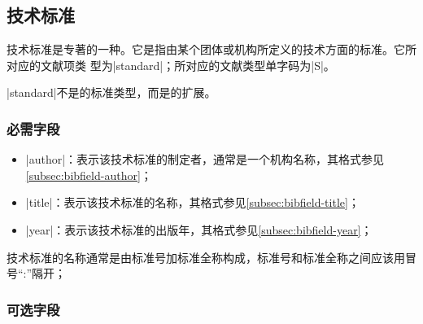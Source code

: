 
\subsection{技术标准}\label{subsec:bibtype-standard}

技术标准是专著的一种。它是指由某个团体或机构所定义的技术方面的标准。它所对应的{\BibTeX}文献项类
型为|standard|；所对应的文献类型单字码为|S|\cite{gbt3469-1983}。

|standard|不是{\BibTeX}的标准类型，而是{\njuthesis}的扩展。

\subsubsection{必需字段}

\begin{itemize}
\item |author|：表示该技术标准的制定者，通常是一个机构名称，其格式参见\ref{subsec:bibfield-author}；
\item |title|：表示该技术标准的名称，其格式参见\ref{subsec:bibfield-title}；
\item |year|：表示该技术标准的出版年，其格式参见\ref{subsec:bibfield-year}；
\end{itemize}

\begin{note}
技术标准的名称通常是由标准号加标准全称构成，标准号和标准全称之间应该用冒号``:''隔开；
\end{note}

\subsubsection{可选字段}

